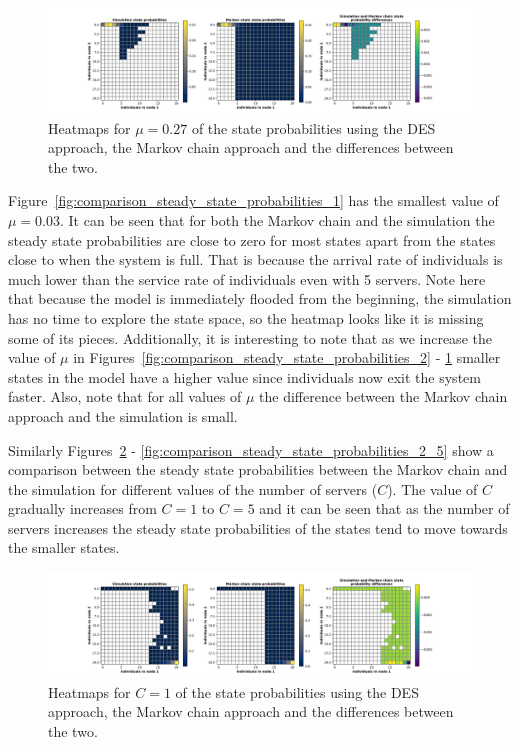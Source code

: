 \begin{figure}[H]
    \includegraphics[width=\textwidth, trim=100 10 100 10, clip]{chapters/03_queueing_model/Bin/numeric_results_and_timings/steady_state_probabilities/main_9.pdf}
    \caption{Heatmaps for \(\mu = 0.27\) of the state probabilities using the
    DES approach, the Markov chain approach and the differences between the
    two.}
    \label{fig:comparison_steady_state_probabilities_5}
\end{figure}

Figure~\ref{fig:comparison_steady_state_probabilities_1} has the smallest
value of \(\mu = 0.03\).
It can be seen that for both the Markov chain and the simulation the steady
state probabilities are close to zero for most states apart from the
states close to when the system is full.
That is because the arrival rate of individuals is much lower than the service
rate of individuals even with 5 servers.
Note here that because the model is immediately flooded from the beginning, the
simulation has no time to explore the state space, so the heatmap looks like
it is missing some of its pieces.
Additionally, it is interesting to note that as we increase the value of \(\mu\)
in Figures~\ref{fig:comparison_steady_state_probabilities_2} -
\ref{fig:comparison_steady_state_probabilities_5} smaller states in the model
have a higher value since individuals now exit the system faster.
Also, note that for all values of \(\mu\) the difference between the Markov
chain approach and the simulation is small.

Similarly Figures~\ref{fig:comparison_steady_state_probabilities_2_1} -
\ref{fig:comparison_steady_state_probabilities_2_5} show a comparison between
the steady state probabilities between the Markov chain and the simulation
for different values of the number of servers (\(C\)).
The value of \(C\) gradually increases from \(C = 1\) to \(C = 5\) and it can
be seen that as the number of servers increases the steady state probabilities
of the states tend to move towards the smaller states.


\begin{figure}[H]
    \includegraphics[width=\textwidth, trim=100 10 100 10, clip]{chapters/03_queueing_model/Bin/numeric_results_and_timings/steady_state_probabilities_2/main_1.pdf}
    \caption{Heatmaps for \(C = 1\) of the state probabilities using the
    DES approach, the Markov chain approach and the differences between the
    two.}
    \label{fig:comparison_steady_state_probabilities_2_1}
\end{figure}

